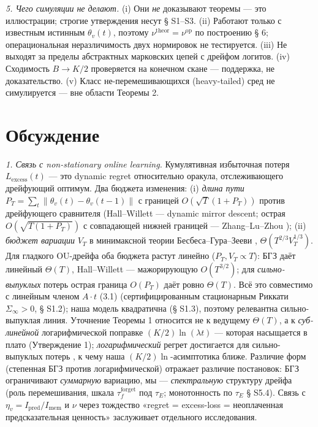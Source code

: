 \documentclass[12pt]{iopart}
\begin{document}
\emph{5. Чего симуляции не делают.} (i) Они \emph{не} доказывают теоремы --- это иллюстрации; строгие утверждения несут § S1--S3. (ii) Работают только с известным истинным \(\theta_v(t)\), поэтому \(\nu^{\text{theor}} = \nu^{\text{op}}\) по построению \cite{Andriishin2026b} § 6; операциональная неразличимость двух нормировок не тестируется. (iii) Не выходят за пределы абстрактных марковских цепей с дрейфом логитов. (iv) Сходимость \(B \to K/2\) проверяется на конечном скане --- поддержка, не доказательство. (v) Класс не-перемешивающихся (heavy-tailed) сред не симулируется --- вне области Теоремы 2.



\section{Обсуждение}\label{ux43eux431ux441ux443ux436ux434ux435ux43dux438ux435}



\emph{1. Связь с non-stationary online learning.} Кумулятивная избыточная потеря \(L_{\text{excess}}(t)\) --- это dynamic regret относительно оракула, отслеживающего дрейфующий оптимум. Два бюджета изменения: (i) \emph{длина пути} \(P_T = \sum_t \|\theta_v(t)-\theta_v(t-1)\|\) \cite{Zinkevich2003} с границей \(O(\sqrt{T}(1+P_T))\) против дрейфующего сравнителя (Hall--Willett \cite{HallWillett2015} --- dynamic mirror descent; острая \(O(\sqrt{T(1+P_T)})\) с совпадающей нижней границей --- Zhang--Lu--Zhou \cite{ZhangLuZhou2018}); (ii) \emph{бюджет вариации} \(V_T\) в минимаксной теории Бесбеса--Гура--Зееви \cite{BesbesGurZeevi2015}, \(\Theta(T^{2/3}V_T^{1/3})\). Для гладкого OU-дрейфа оба бюджета растут линейно (\(P_T, V_T \propto T\)): БГЗ даёт линейный \(\Theta(T)\), Hall--Willett --- мажорирующую \(O(T^{3/2})\); для \emph{сильно-выпуклых} потерь острая граница \(O(P_T)\) \cite{Mokhtari2016} даёт ровно \(\Theta(T)\). Всё это совместимо с линейным членом \(A\cdot t\) (3.1) (сертифицированным стационарным Риккати \(\Sigma_\infty > 0\), § S1.2); наша модель квадратична (§ S1.3), поэтому релевантна сильно-выпуклая линия. Уточнение Теоремы 1 относится не к ведущему \(\Theta(T)\), а к \emph{суб-линейной} логарифмической поправке \((K/2)\ln(\lambda t)\) --- которая насыщается в плато (Утверждение 1); \emph{логарифмический} регрет достигается для сильно-выпуклых потерь \cite{Hazan2007,HazanSeshadhri2009}, к чему наша \((K/2)\ln\)-асимптотика ближе. Различие форм (степенная БГЗ против логарифмической) отражает различие постановок: БГЗ ограничивают \emph{суммарную} вариацию, мы --- \emph{спектральную} структуру дрейфа (роль перемешивания, шкала \(\tau_f^{\text{forget}}\) под \(\tau_E\); монотонность по \(\tau_E\) \cite{Andriishin2026b} § S5.4). Связь с \(\eta_v = I_{\text{pred}}/I_{\text{mem}}\) и \(\nu\) через тождество «regret = excess-loss = неоплаченная предсказательная ценность» \cite{CesaBianchiLugosi2006,Hazan2007} заслуживает отдельного исследования.
\end{document}
